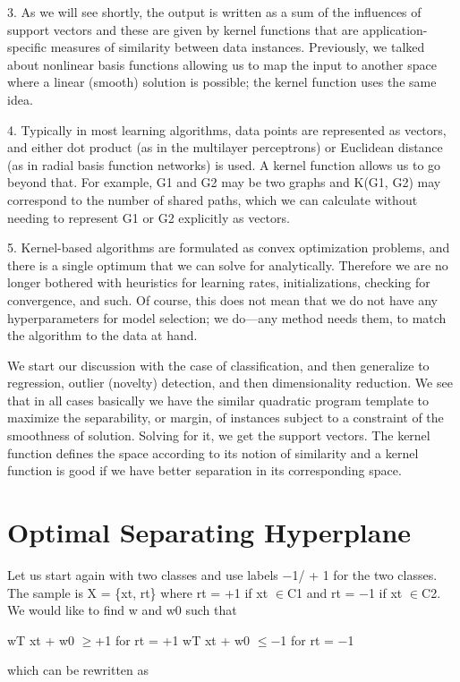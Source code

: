 3. As we will see shortly, the output is written as a sum of the influences of support vectors and these are given by kernel functions that are application-specific measures of similarity between data instances. Previously, we talked about nonlinear basis functions allowing us to map the input to another space where a linear (smooth) solution is possible; the kernel function uses the same idea.

4. Typically in most learning algorithms, data points are represented as vectors, and either dot product (as in the multilayer perceptrons) or Euclidean distance (as in radial basis function networks) is used. A kernel function allows us to go beyond that. For example, G1 and G2 may be two graphs and K(G1, G2) may correspond to the number of shared paths, which we can calculate without needing to represent G1 or G2 explicitly as vectors.

5. Kernel-based algorithms are formulated as convex optimization problems, and there is a single optimum that we can solve for analytically. Therefore we are no longer bothered with heuristics for learning rates, initializations, checking for convergence, and such. Of course, this does not mean that we do not have any hyperparameters for model selection; we do---any method needs them, to match the algorithm to the data at hand.

We start our discussion with the case of classification, and then generalize to regression, outlier (novelty) detection, and then dimensionality reduction. We see that in all cases basically we have the similar quadratic program template to maximize the separability, or margin, of instances subject to a constraint of the smoothness of solution. Solving for it, we get the support vectors. The kernel function defines the space according to its notion of similarity and a kernel function is good if we have better separation in its corresponding space.

\section{Optimal Separating Hyperplane}

Let us start again with two classes and use labels $-$1/ + 1 for the two classes. The sample is X = \{xt, rt\} where rt = +1 if xt $\in$C1 and rt = $-$1 if xt $\in$C2. We would like to find w and w0 such that

wT xt + w0 $\geq$+1 for rt = +1 wT xt + w0 $\leq$$-$1 for rt = $-$1

which can be rewritten as

